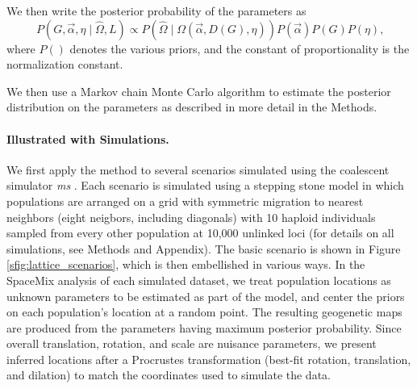 \documentclass[12pt]{article}
\begin{document}
We then write the posterior probability of the parameters as 
\begin{equation}
\label{eq:cyol_prob}
P \left( G, \vec{\alpha}, \eta \mid \widehat{\Omega}, L \right) \propto  
	P \left( \widehat{\Omega}  \mid \Omega(\vec{\alpha},{D}(G),\eta ) \right) P(\vec{\alpha}) P(G) P(\eta) \text{,}
\end{equation}
where $P( )$ denotes the various priors, and the constant of proportionality is the normalization constant.  

We then use a Markov chain Monte Carlo algorithm to estimate the posterior distribution on the parameters as described in more detail in the Methods.


\paragraph{Illustrated with Simulations.} 
We first apply the method to several scenarios simulated using the coalescent simulator \textit{ms} \citep{Hudson2002}.  
Each scenario is simulated using a stepping stone model in which populations are arranged on a grid with symmetric migration 
to nearest neighbors (eight neigbors, including diagonals)
with 10 haploid individuals sampled from every other population at 10,000 unlinked loci (for details on all simulations, see Methods and Appendix).  
The basic scenario is shown in Figure \ref{sfig:lattice_scenarios}, 
which is then embellished in various ways.
In the SpaceMix analysis of each simulated dataset, 
we treat population locations as unknown parameters to be estimated as part of the model, 
and center the priors on each population's location at a random point.
The resulting geogenetic maps are produced from the parameters having maximum posterior probability.
Since overall translation, rotation, and scale are nuisance parameters,
we present inferred locations after a Procrustes transformation
(best-fit rotation, translation, and dilation) 
to match the coordinates used to simulate the data.
\end{document}
